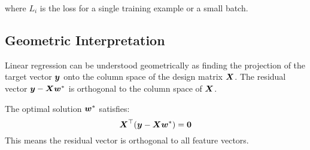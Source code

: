 where $L_i$ is the loss for a single training example or a small batch.

\subsection{Geometric Interpretation}

Linear regression can be understood geometrically as finding the projection of the target vector $\boldsymbol{y}$ onto the column space of the design matrix $\boldsymbol{X}$. The residual vector $\boldsymbol{y} - \boldsymbol{X}\boldsymbol{w}^*$ is orthogonal to the column space of $\boldsymbol{X}$.

\begin{theorem}
The optimal solution $\boldsymbol{w}^*$ satisfies:
$$\boldsymbol{X}^\top(\boldsymbol{y} - \boldsymbol{X}\boldsymbol{w}^*) = \boldsymbol{0}$$
This means the residual vector is orthogonal to all feature vectors.
\end{theorem}

